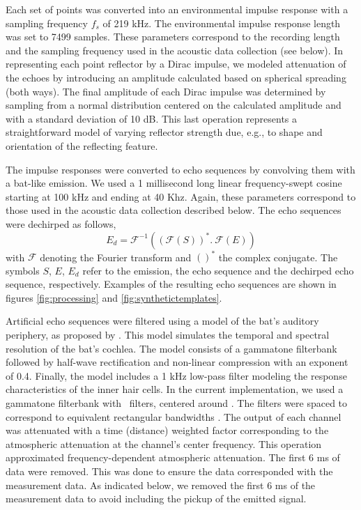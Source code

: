 \documentclass[preprint,5p]{elsarticle}
\begin{document}
Each set of points was converted into an environmental impulse response with a sampling frequency $f_s$ of 219 kHz. The environmental impulse response length was set to 7499 samples. These parameters correspond to the recording length and the sampling frequency used in the acoustic data collection (see below). In representing each point reflector by a Dirac impulse, we modeled attenuation of the echoes by introducing an amplitude calculated based on spherical spreading (both ways). The final amplitude of each Dirac impulse was determined by sampling from a normal distribution centered on the calculated amplitude and with a standard deviation of 10 dB. This last operation represents a straightforward model of varying reflector strength due, e.g., to shape and orientation of the reflecting feature.

The impulse responses were converted to echo sequences by convolving them with a bat-like emission. We used a 1 millisecond long linear frequency-swept cosine starting at 100 kHz and ending at 40 Khz. Again, these parameters correspond to those used in the acoustic data collection described below. The echo sequences were dechirped as follows, 
%
%
\begin{equation}\label{key}
E_d = \mathcal{F}^{-1}((\mathcal{F}(S))^* . \ \mathcal{F}(E))
\end{equation}
with $\mathcal{F}$ denoting the Fourier transform and $()^*$ the complex conjugate. The symbols $S$, $E$, $E_d$ refer to the emission, the echo sequence and the dechirped echo sequence, respectively. Examples of the resulting echo sequences are shown in figures \ref{fig:processing} and \ref{fig:synthetictemplates}. 

Artificial echo sequences were filtered using a model of the bat's auditory periphery, as proposed by \citet{Wiegrebe2008}. This model simulates the temporal and spectral resolution of the bat's cochlea. The model consists of a gammatone filterbank followed by half-wave rectification and non-linear compression with an exponent of 0.4. Finally, the model includes a 1 kHz low-pass filter modeling the response characteristics of the inner hair cells. In the current implementation, we used a gammatone filterbank with \nfilters\ filters, centered around \FilterCenter. The filters were spaced to correspond to equivalent rectangular bandwidths \citep{Glasberg1990}. The output of each channel was attenuated with a time (distance) weighted factor corresponding to the atmospheric attenuation at the channel's center frequency. This operation approximated frequency-dependent atmospheric attenuation. The first 6 ms of data were removed. This was done to ensure the data corresponded with the measurement data. As indicated below, we removed the first 6 ms of the measurement data to avoid including the pickup of the emitted signal. 
\end{document}
